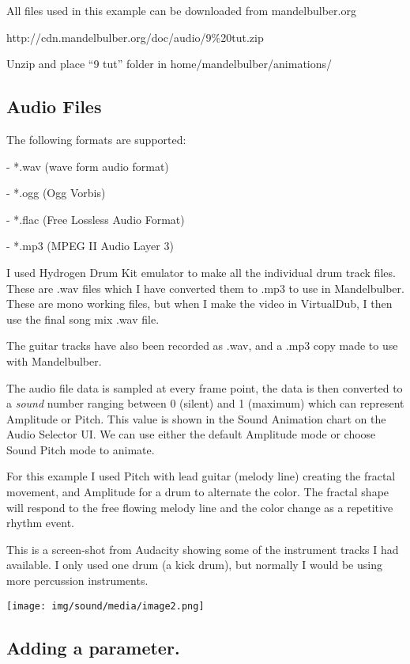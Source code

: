All files used in this example can be downloaded from mandelbulber.org

http://cdn.mandelbulber.org/doc/audio/9\%20tut.zip

Unzip and place ``9 tut'' folder in home/mandelbulber/animations/

\subsection{Audio Files}\label{audio-files}

The following formats are supported:

- *.wav (wave form audio format)

- *.ogg (Ogg Vorbis)

- *.flac (Free Lossless Audio Format)

- *.mp3 (MPEG II Audio Layer 3)

I used Hydrogen Drum Kit emulator to make all the individual drum track
files. These are .wav files which I have converted them to
.mp3 to use in Mandelbulber. These are mono working files, but when I make the video in VirtualDub, I then use the final song mix .wav file.

The guitar tracks have also been recorded as .wav, and a .mp3 copy made
to use with Mandelbulber.

The audio file data is sampled at every frame point, the data is then
converted to a \emph{sound} number ranging between 0 (silent) and 1
(maximum) which can represent Amplitude or Pitch. This value is shown in
the Sound Animation chart on the Audio Selector UI. We can use either
the default Amplitude mode or choose Sound Pitch mode to animate.

For this example I used Pitch with lead guitar (melody line) creating
the fractal movement, and Amplitude for a drum to alternate the color.
The fractal shape will respond to the free flowing melody line and the
color change as a repetitive rhythm event.

This is a screen-shot from Audacity showing some of the instrument
tracks I had available. I only used one drum (a kick drum), but normally
I would be using more percussion instruments.

\texttt{[image: img/sound/media/image2.png]}

\subsection{Adding a parameter.}\label{adding-a-parameter.}

